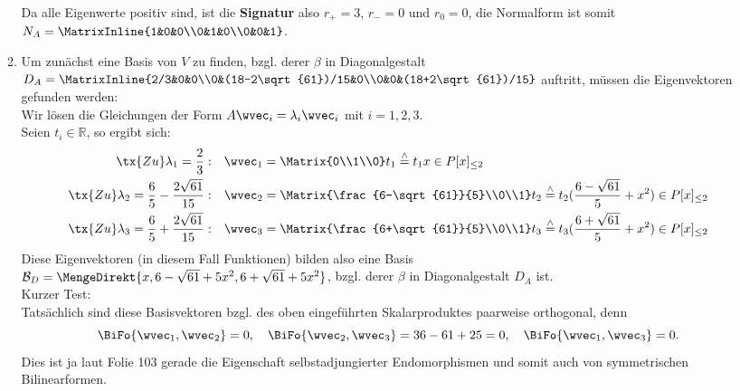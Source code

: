 \begin{Beispiel}
\begin{enumerate}
\begin{enumerate}
        Da alle Eigenwerte positiv sind, ist die \textbf{Signatur} also $r_+=3$, $r_-=0$ und $r_0=0$, die Normalform ist somit $N_A=\MatrixInline{1&0&0\\0&1&0\\0&0&1}$.
        \item Um zunächst eine Basis von $V$ zu finden, bzgl. derer $\beta$ in Diagonalgestalt $D_A=\MatrixInline{2/3&0&0\\0&(18-2\sqrt{61})/15&0\\0&0&(18+2\sqrt{61})/15}$ auftritt, müssen die Eigenvektoren gefunden werden:\\
        Wir lösen die Gleichungen der Form $A\wvec_i=\lambda_i\wvec_i$ mit $i=1,2,3$.\\
        Seien $t_i\in\mathbb{R}$, so ergibt sich:
        \begin{align*}
            \tx{Zu }\lambda_1=\frac{2}{3}:\quad&\wvec_1=\Matrix{0\\1\\0}t_1\overset{\wedge}{=}t_1x\in P[x]_{\leq2}\\
            \tx{Zu }\lambda_2=\frac{6}{5}-\frac{2\sqrt{61}}{15}:\quad&\wvec_2=\Matrix{\frac{6-\sqrt{61}}{5}\\0\\1}t_2\overset{\wedge}{=}t_2(\frac{6-\sqrt{61}}{5}+x^2)\in P[x]_{\leq2}\\
            \tx{Zu }\lambda_3=\frac{6}{5}+\frac{2\sqrt{61}}{15}:\quad&\wvec_3=\Matrix{\frac{6+\sqrt{61}}{5}\\0\\1}t_3\overset{\wedge}{=}t_3(\frac{6+\sqrt{61}}{5}+x^2)\in P[x]_{\leq2}
        \end{align*}
        Diese Eigenvektoren (in diesem Fall Funktionen) bilden also eine Basis\\ $\mathcal{B}_D=\MengeDirekt{x, 6-\sqrt{61}+5x^2, 6+\sqrt{61}+5x^2}$, bzgl. derer $\beta$ in Diagonalgestalt $D_A$ ist.\\
        Kurzer Test:\\
        Tatsächlich sind diese Basisvektoren bzgl. des oben eingeführten Skalarproduktes paarweise orthogonal, denn
        \begin{equation*}
            \BiFo{\wvec_1,\wvec_2}=0,\quad \BiFo{\wvec_2,\wvec_3}=36-61+25=0,\quad \BiFo{\wvec_1,\wvec_3}=0.
        \end{equation*}
        Dies ist ja laut Folie 103 gerade die Eigenschaft selbstadjungierter Endomorphismen und somit auch von symmetrischen Bilinearformen.
    \end{enumerate}

\end{enumerate}
\end{Beispiel}
